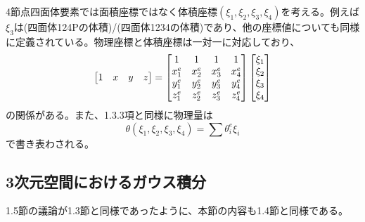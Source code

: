 \documentclass[dvipdfmx, 9pt, a4paper]{jsarticle}
\numberwithin{equation}{section}
\begin{document}
4節点四面体要素では面積座標ではなく体積座標$(\xi_1, \xi_2, \xi_3, \xi_4)$を考える。例えば$\xi_3$は(四面体124Pの体積)/(四面体1234の体積)であり、他の座標値についても同様に定義されている。物理座標と体積座標は一対一に対応しており、
\begin{equation}
\begin{bmatrix}
1 & x & y & z
\end{bmatrix}=
\begin{bmatrix}
1 & 1 & 1 & 1 \\
x^e_1 & x^e_2 & x^e_3 & x^e_4 \\
y^e_1 & y^e_2 & y^e_3 & y^e_4 \\
z^e_1 & z^e_2 & z^e_3 & z^e_4 \\
\end{bmatrix}
\begin{bmatrix}
\xi_1 \\ \xi_2 \\ \xi_3 \\ \xi_4
\end{bmatrix} \notag
\end{equation}
の関係がある。また、1.3.3項と同様に物理量は
\begin{equation}
\theta(\xi_1, \xi_2, \xi_3, \xi_4)=\sum \theta^e_i \xi_i
\end{equation}
で書き表わされる。

\subsection{3次元空間におけるガウス積分}
1.5節の議論が1.3節と同様であったように、本節の内容も1.4節と同様である。
\end{document}
